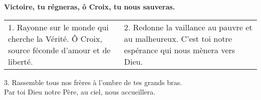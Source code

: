 \textbf{Victoire, tu régneras, ô Croix, tu nous sauveras.}

\begin{tabular}{p{} p{}}
1.
Rayonne sur le monde qui cherche la Vérité.
Ô Croix, source féconde d'amour et de liberté.
&
2.
Redonne la vaillance au pauvre et au malheureux.
C'est toi notre espérance qui nous mènera vers Dieu.
\end{tabular}
3.
Rassemble tous nos frères à l'ombre de tes grands bras.\\
Par toi Dieu notre Père, au ciel, nous accueillera. 
